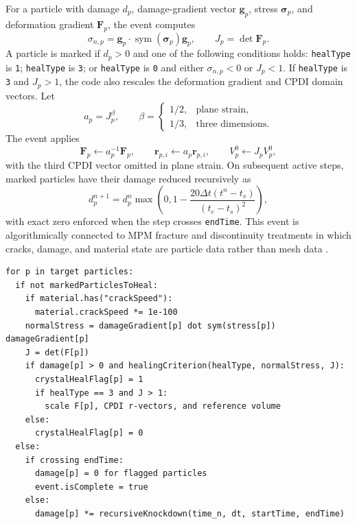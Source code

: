 For a particle with damage $d_p$, damage-gradient vector $\mathbf{g}_p$, stress $\boldsymbol{\sigma}_p$, and deformation gradient $\mathbf{F}_p$, the event computes
\begin{equation}
  \sigma_{n,p} = \mathbf{g}_p\cdot\operatorname{sym}(\boldsymbol{\sigma}_p)\mathbf{g}_p,
  \qquad J_p = \det\mathbf{F}_p.
  \label{eq:crystal-heal-indicators}
\end{equation}
A particle is marked if $d_p>0$ and one of the following conditions holds: \texttt{healType} is \texttt{1}; \texttt{healType} is \texttt{3}; or \texttt{healType} is \texttt{0} and either $\sigma_{n,p}<0$ or $J_p<1$.  If \texttt{healType} is \texttt{3} and $J_p>1$, the code also rescales the deformation gradient and CPDI domain vectors.  Let
\begin{equation}
  a_p = J_p^\beta,
  \qquad
  \beta=\begin{cases}1/2, & \text{plane strain},\\1/3, & \text{three dimensions}.
  \end{cases}
\end{equation}
The event applies
\begin{equation}
  \mathbf{F}_p \leftarrow a_p^{-1}\mathbf{F}_p,
  \qquad
  \mathbf{r}_{p,i}\leftarrow a_p\mathbf{r}_{p,i},
  \qquad
  V^0_p \leftarrow J_p V^0_p,
  \label{eq:crystal-heal-volume-scaling}
\end{equation}
with the third CPDI vector omitted in plane strain.  On subsequent active steps, marked particles have their damage reduced recursively as
\begin{equation}
  d_p^{n+1}=d_p^n\max\left(0,1-\dfrac{20\Delta t(t^n-t_s)}{(t_e-t_s)^2}\right),
  \label{eq:crystal-heal-damage-decay}
\end{equation}
with exact zero enforced when the step crosses \texttt{endTime}.  This event is algorithmically connected to MPM fracture and discontinuity treatments in which cracks, damage, and material state are particle data rather than mesh data \cite{nairn2003cramp,homel2016dfg,homel2016domaindef}.

\begin{lstlisting}[caption={CrystalHeal event pseudocode.}]
for p in target particles:
  if not markedParticlesToHeal:
    if material.has("crackSpeed"):
      material.crackSpeed *= 1e-100
    normalStress = damageGradient[p] dot sym(stress[p]) damageGradient[p]
    J = det(F[p])
    if damage[p] > 0 and healingCriterion(healType, normalStress, J):
      crystalHealFlag[p] = 1
      if healType == 3 and J > 1:
        scale F[p], CPDI r-vectors, and reference volume
    else:
      crystalHealFlag[p] = 0
  else:
    if crossing endTime:
      damage[p] = 0 for flagged particles
      event.isComplete = true
    else:
      damage[p] *= recursiveKnockdown(time_n, dt, startTime, endTime)
\end{lstlisting}

